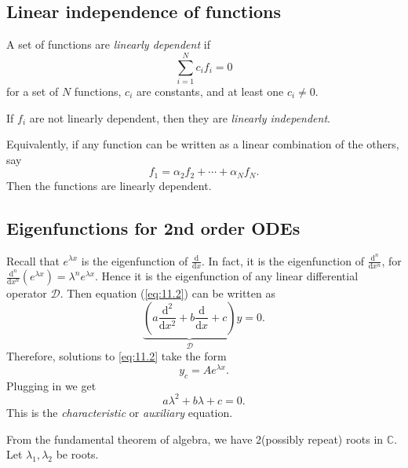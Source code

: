 \documentclass[a4paper]{article}
\begin{document}
    \subsection{Linear independence of functions}
    \begin{definition}
        A set of functions are \textit{linearly dependent} if 
        \begin{equation}\label{eq:11.3}
            \sum_{i=1}^{N} c_if_i=0
        \end{equation}
        for a set of $N$ functions, $c_i$ are constants, and at least one $c_i\neq 0$.

        If $f_i$ are not linearly dependent, then they are \textit{linearly independent}.
    \end{definition}
    Equivalently, if any function can be written as a linear combination of the others, say
    \[
        f_1=\alpha_2 f_2+\cdots+\alpha_N f_N
    .\]
    Then the functions are linearly dependent.
    \subsection{Eigenfunctions for 2nd order ODEs}
    Recall that $ e^{\lambda x} $ is the eigenfunction of $ \frac{\mathrm{d}}{\mathrm{d}x}  $. In fact, it is the eigenfunction of $ \frac{\mathrm{d}^n}{\mathrm{d}x^n}  $, for $ \frac{\mathrm{d}^n}{\mathrm{d}x^n} (e^{\lambda x})=\lambda^{n}e^{\lambda x} $. Hence it is the eigenfunction of any linear differential operator $ \mathcal{D} $. Then equation (\ref{eq:11.2}) can be written as
    \[
        \underbrace{\left( a\frac{\mathrm{d}^2}{\mathrm{d}x^2}+b \frac{\mathrm{d}}{\mathrm{d}x}+c \right)}_{\mathcal{D}}y=0
    .\]
    Therefore, solutions to \ref{eq:11.2} take the form
    \[
        y_c=Ae^{\lambda x}
    .\]
    Plugging in we get 
    \begin{equation}\label{eq:11.3}
        a\lambda^2+b\lambda+c=0.
    \end{equation}
    This is the \textit{characteristic} or \textit{auxiliary} equation.

    From the fundamental theorem of algebra, we have 2(possibly repeat) roots in $ \mathbb{C} $. Let $ \lambda_1, \lambda_2 $ be roots. 
\end{document}
